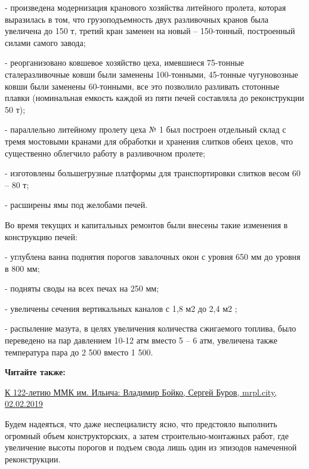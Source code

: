 - произведена модернизация кранового хозяйства литейного пролета, которая
выразилась в том, что грузоподъемность двух разливочных кранов была увеличена
до 150 т, третий кран заменен на новый – 150-тонный, построенный силами самого
завода;

- реорганизовано ковшевое хозяйство цеха, имевшиеся 75-тонные сталеразливочные
ковши были заменены 100-тонными, 45-тонные чугуновозные ковши были заменены
60-тонными, все это позволило разливать стотонные плавки (номинальная емкость
каждой из пяти печей составляла до реконструкции 50 т);

- параллельно литейному пролету цеха № 1 был построен отдельный склад с тремя
мостовыми кранами для обработки и хранения слитков обеих цехов, что существенно
облегчило работу в разливочном пролете;

- изготовлены большегрузные платформы для транспортировки слитков весом 60 – 80
т;

- расширены ямы под желобами печей.

Во время текущих и капитальных ремонтов были внесены такие изменения в
конструкцию печей:

- углублена ванна поднятия порогов завалочных окон с уровня 650 мм до уровня в
800 мм;

- подняты своды на всех печах на 250 мм;

- увеличены сечения вертикальных каналов с 1,8 м2 до 2,4 м2 ;

- распыление мазута, в целях увеличения количества сжигаемого топлива, было
переведено на пар давлением 10-12 атм вместо 5 – 6 атм, увеличена также
температура пара до 2 500 вместо 1 500.

\vspace{0.5cm}
\begin{minipage}{0.9\textwidth}
	
\textbf{Читайте также:} 

\href{https://archive.org/details/02_02_2019.sergij_burov.mrpl_city.k_122_letiu_mkk_im_iljicha_vladimir_bojko}{%
К 122-летию ММК им. Ильича: Владимир Бойко, Сергей Буров, mrpl.city, 02.02.2019}
\end{minipage}
\vspace{0.5cm}

Будем надеяться, что даже неспециалисту ясно, что предстояло выполнить огромный
объем конструкторских, а затем строительно-монтажных работ, где увеличение
высоты порогов и подъем свода лишь один из эпизодов намеченной реконструкции.

